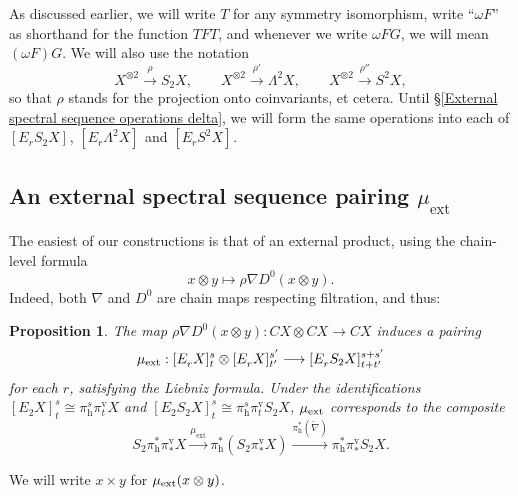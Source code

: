 \documentclass[11pt]{amsart} \renewcommand{\baselinestretch}{1.4}
\theoremstyle{plain}
\newtheorem{prop}[thm]{Proposition}
\theoremstyle{definition}
\renewcommand{\to}{\longrightarrow}
\newcommand{\scrC}{\mathscr{C}}
\newcommand{\ExtCohProd}{\mu_\mathrm{ext}}
\newcommand{\twist}{\omega}
\newcommand{\Nabla}{\nabla}
\newcommand{\algs}{{\scrC\!\textit{om}}}
\newcommand{\E}[5]{[E^{#1}_{#2}#3]^{#4}_{#5}}
\newcommand{\Edownup}[5]{[E_{#1}^{#2}#3]^{#4}_{#5}}
\newcommand{\uver}{^\mathrm{v}}
\newcommand{\dhor}{_\mathrm{h}}
\renewcommand{\mapsto}{\longmapsto}
\begin{document}
\begin{second quadrant homotopy sseq operations}
As discussed earlier, we will write $T$ for any symmetry isomorphism, write ``$\twist F$'' as shorthand for the function $TFT$, and  whenever we write $\twist FG$, we will mean $(\twist F)G$. We will also use the notation
\[X^{\otimes2}\overset{\rho}{\to}S_2X,\qquad X^{\otimes2}\overset{\rho'}{\to}\Lambda^2X,\qquad X^{\otimes2}\overset{\rho''}{\to}S^2X,\]
so that $\rho$ stands for the projection onto coinvariants, et cetera. Until \S\ref{External spectral sequence operations delta}, we will form the same operations into each of $\Edownup{r}{}{S_2X}{}{}$, $\Edownup{r}{}{\Lambda^2X}{}{}$ and $\Edownup{r}{}{S^2X}{}{}$.

\subsection{An external spectral sequence pairing $\mu_\mathrm{ext}$}
The easiest of our constructions is that of an external product, using 
the chain-level formula
\[x\otimes y\mapsto\rho\Nabla D^0(x\otimes y).\]
Indeed, both $\Nabla$ and $D^0$ are chain maps respecting filtration, and thus:
\begin{prop}
\label{prop on basic product}
The map $\rho\Nabla D^0(x\otimes y):CX\otimes CX\to CX$ induces a pairing
\[\mu_\textup{ext}:\Edownup{r}{}{X}{s}{t}\otimes \Edownup{r}{}{X}{s'}{t'}\to \Edownup{r}{}{S_2X}{s+s'}{t+t'}\]
for each $r$, satisfying the Liebniz formula. Under the identifications $\Edownup{2}{}{X}{s}{t}\cong \pi\dhor^s\pi\uver_t X$ and $\Edownup{2}{}{S_2X}{s}{t}\cong \pi\dhor^s\pi\uver_t S_2X$, $\mu_\textup{ext}$ corresponds to the composite
\[S_2\pi\dhor^*\pi\uver_* X
\overset{\ExtCohProd}{\to} 
\pi\dhor^*(S_2\pi\uver_* X)
\overset{\pi\dhor^{*}(\widetilde{\nabla})}{\to}
\pi\dhor^{*}\pi\uver_{*}S_2 X.\]
\end{prop}
\noindent We will write $x\times y$ for $\mu_\textup{ext}(x\otimes y)$.
%

\end{second quadrant homotopy sseq operations}
\end{document}
